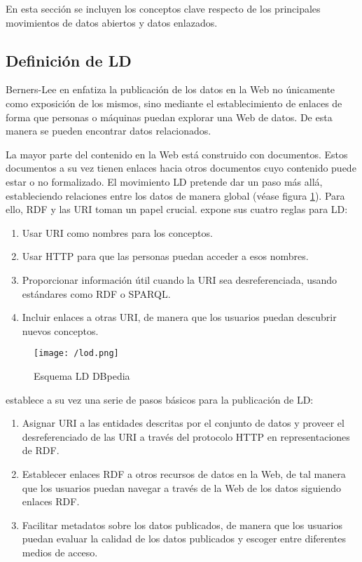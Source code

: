 En esta sección se incluyen los conceptos clave respecto de los principales
movimientos de datos abiertos y datos enlazados. 

\subsection{Definición de \acs{LD}}

Berners-Lee en \cite{bernerslee:2009} enfatiza la publicación de los datos en la
Web no únicamente como exposición de los mismos, sino mediante el establecimiento de enlaces
de forma que personas o máquinas puedan explorar una Web de datos. De esta
manera se pueden encontrar datos relacionados. 

La mayor parte del contenido en la Web está construido con documentos. Estos
documentos a su vez tienen enlaces hacia otros documentos cuyo contenido puede
estar o no formalizado. El movimiento \acs{LD} pretende dar un paso más allá,
estableciendo relaciones entre los datos de manera global (véase figura \ref{fig:dbpedialod}). Para ello, \acs{RDF}
y las \acs{URI} toman un papel crucial. \cite{bernerslee:2009} expone
sus cuatro reglas para \acs{LD}:  

\begin{enumerate}
\item Usar \acs{URI} como nombres para los conceptos.
\item Usar \acs{HTTP} para que las personas puedan acceder a esos nombres. 
\item Proporcionar información útil cuando la \acs{URI} sea desreferenciada,
  usando estándares como \acs{RDF} o \acs{SPARQL}. 
\item Incluir enlaces a otras \acs{URI}, de manera que los usuarios puedan
  descubrir nuevos conceptos. 
\end{enumerate}


\begin{figure}[!h]
  \begin{center}
    \texttt{[image: /lod.png]} 
    \caption{Esquema \acs{LD} DBpedia}
    \label{fig:dbpedialod}
  \end{center}
\end{figure}



\cite{bizer_linked_2009} establece a su vez una serie de pasos básicos para la
publicación de \acs{LD}: 

\begin{enumerate}
\item Asignar \acs{URI} a las entidades descritas por el conjunto de datos y
  proveer el desreferenciado de las \acs{URI} a través del protocolo \acs{HTTP}
  en representaciones de \acs{RDF}.
\item Establecer enlaces \acs{RDF} a otros recursos de datos en la Web, de tal
  manera que los usuarios puedan navegar a través de la Web de los datos
  siguiendo enlaces \acs{RDF}.
\item Facilitar metadatos sobre los datos publicados, de manera que los usuarios
  puedan evaluar la calidad de los datos publicados y escoger entre diferentes
  medios de acceso.
\end{enumerate}

